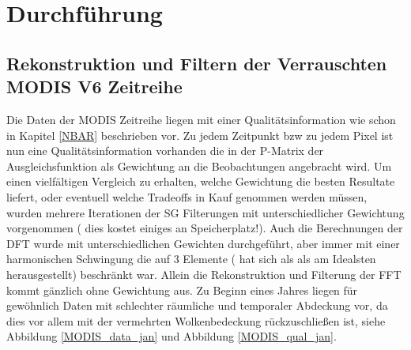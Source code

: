 \documentclass[11pt]{report}
\begin{document}
\chapter{Durchführung}
\section{Rekonstruktion und Filtern der Verrauschten MODIS V6 Zeitreihe}
Die Daten der MODIS Zeitreihe liegen mit einer Qualitätsinformation wie schon in Kapitel \ref{NBAR} beschrieben vor. Zu jedem Zeitpunkt bzw zu jedem Pixel ist nun eine Qualitätsinformation vorhanden die in der P-Matrix der Ausgleichsfunktion als Gewichtung an die Beobachtungen angebracht wird. Um einen vielfältigen Vergleich zu erhalten, welche Gewichtung die besten Resultate liefert, oder eventuell welche Tradeoffs in Kauf genommen werden müssen, wurden mehrere Iterationen der SG Filterungen mit unterschiedlicher Gewichtung vorgenommen ( dies kostet einiges an Speicherplatz!). Auch die Berechnungen der DFT wurde mit unterschiedlichen Gewichten durchgeführt, aber immer mit einer harmonischen Schwingung die auf 3 Elemente ( hat sich als als am Idealsten herausgestellt) beschränkt war. Allein die Rekonstruktion und Filterung der FFT kommt gänzlich ohne Gewichtung aus. Zu Beginn eines Jahres liegen für gewöhnlich Daten mit schlechter räumliche und temporaler Abdeckung vor, da dies vor allem mit der vermehrten Wolkenbedeckung rückzuschließen ist, siehe Abbildung \ref{MODIS_data_jan} und Abbildung \ref{MODIS_qual_jan}.
\end{document}
